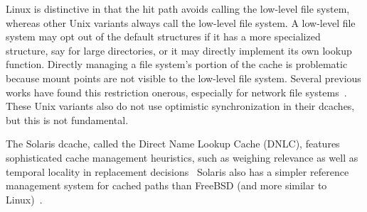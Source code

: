 Linux is distinctive in that the hit path avoids calling the low-level file system,
whereas other Unix variants always call the low-level file system.
A low-level file system may opt out of the default structures if it has a
more specialized structure, say for large directories, or it may 
directly implement its own lookup function.
Directly managing a file system's portion of the cache is problematic 
because mount points are not visible to the low-level file system.
Several previous works have found this restriction onerous, especially for network file systems~\cite{duchamp94nfs}.
These Unix variants also do not use optimistic synchronization in their dcaches,
but this is not fundamental.

The Solaris dcache, called the Direct Name Lookup Cache (DNLC),
features sophisticated cache management heuristics, such as weighing relevance as well as 
temporal locality in replacement decisions~\cite{solarisinternals}
Solaris also has a simpler reference management system for cached paths than FreeBSD (and more similar to Linux)~\cite{freebsd-complexity}.





